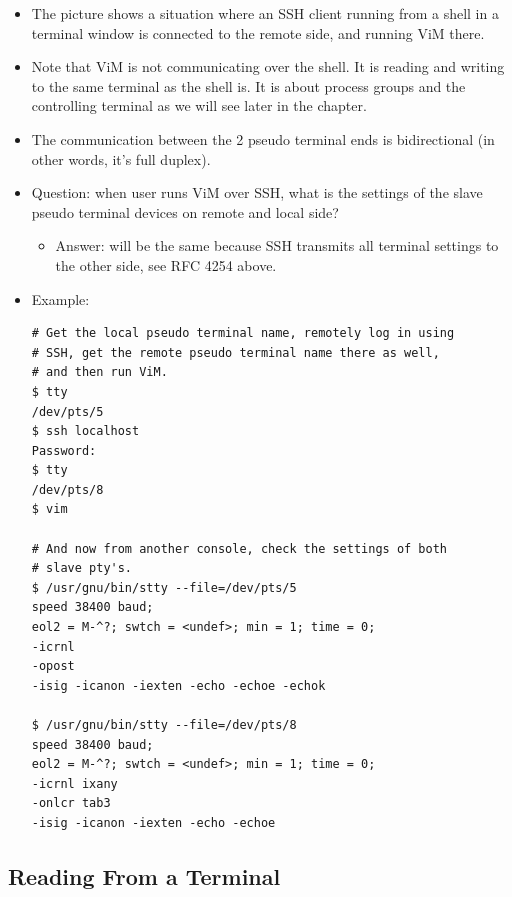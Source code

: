 \begin{itemize}
\item The picture shows a situation where an SSH client running from a shell in
a terminal window is connected to the remote side, and running ViM there.
\item Note that ViM is not communicating over the shell. It is reading and
writing to the same terminal as the shell is. It is about process groups and
the controlling terminal as we will see later in the chapter.
\item The communication between the 2 pseudo terminal ends is bidirectional (in
other words, it's full duplex).
\item Question: when user runs ViM over SSH, what is the settings of the slave
pseudo terminal devices on remote and local side?
	\begin{itemize}
	\item Answer: will be the same because SSH transmits all terminal
	settings to the other side, see RFC 4254 above.
	\end{itemize}
\item Example:

\begin{verbatim}
# Get the local pseudo terminal name, remotely log in using
# SSH, get the remote pseudo terminal name there as well,
# and then run ViM.
$ tty
/dev/pts/5
$ ssh localhost
Password: 
$ tty
/dev/pts/8
$ vim 

# And now from another console, check the settings of both
# slave pty's.
$ /usr/gnu/bin/stty --file=/dev/pts/5
speed 38400 baud;
eol2 = M-^?; swtch = <undef>; min = 1; time = 0;
-icrnl
-opost
-isig -icanon -iexten -echo -echoe -echok

$ /usr/gnu/bin/stty --file=/dev/pts/8
speed 38400 baud;
eol2 = M-^?; swtch = <undef>; min = 1; time = 0;
-icrnl ixany
-onlcr tab3
-isig -icanon -iexten -echo -echoe
\end{verbatim}

\end{itemize}

\subsection{Reading From a Terminal}

